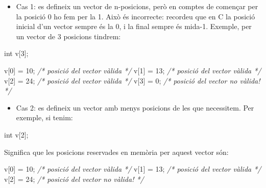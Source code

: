 \documentclass[]{book}
\newenvironment{Shaded}{\begin{snugshade}}{\end{snugshade}}
\newcommand{\DataTypeTok}[1]{\textcolor[rgb]{0.13,0.29,0.53}{#1}}
\newcommand{\DecValTok}[1]{\textcolor[rgb]{0.00,0.00,0.81}{#1}}
\newcommand{\CommentTok}[1]{\textcolor[rgb]{0.56,0.35,0.01}{\textit{#1}}}
\newcommand{\NormalTok}[1]{#1}
\providecommand{\tightlist}{%
  \setlength{\itemsep}{0pt}\setlength{\parskip}{0pt}}
\begin{document}
\begin{itemize}
\tightlist
\item
  Cas 1: es defineix un vector de n-posicions, però en comptes de
  començar per la posició 0 ho fem per la 1. Això és incorrecte:
  recordeu que en C la posició inicial d'un vector sempre és la 0, i la
  final sempre és mida-1. Exemple, per un vector de 3 posicions tindrem:
\end{itemize}

\begin{Shaded}
\begin{Highlighting}[]
\DataTypeTok{int}\NormalTok{ v[}\DecValTok{3}\NormalTok{];}

\NormalTok{v[}\DecValTok{0}\NormalTok{] = }\DecValTok{10}\NormalTok{;  }\CommentTok{/* posició del vector vàlida */}
\NormalTok{v[}\DecValTok{1}\NormalTok{] = }\DecValTok{13}\NormalTok{;  }\CommentTok{/* posició del vector vàlida */}
\NormalTok{v[}\DecValTok{2}\NormalTok{] = }\DecValTok{24}\NormalTok{;  }\CommentTok{/* posició del vector vàlida */}
\NormalTok{v[}\DecValTok{3}\NormalTok{] = }\DecValTok{0}\NormalTok{;   }\CommentTok{/* posició del vector no vàlida! */}
\end{Highlighting}
\end{Shaded}

\begin{itemize}
\tightlist
\item
  Cas 2: es defineix un vector amb menys posicions de les que
  necessitem. Per exemple, si tenim:
\end{itemize}

\begin{Shaded}
\begin{Highlighting}[]
\DataTypeTok{int}\NormalTok{ v[}\DecValTok{2}\NormalTok{];}
\end{Highlighting}
\end{Shaded}

Significa que les posicions reservades en memòria per aquest vector són:

\begin{Shaded}
\begin{Highlighting}[]
\NormalTok{v[}\DecValTok{0}\NormalTok{] = }\DecValTok{10}\NormalTok{;  }\CommentTok{/* posició del vector vàlida */}
\NormalTok{v[}\DecValTok{1}\NormalTok{] = }\DecValTok{13}\NormalTok{;  }\CommentTok{/* posició del vector vàlida */}
\NormalTok{v[}\DecValTok{2}\NormalTok{] = }\DecValTok{24}\NormalTok{;  }\CommentTok{/* posició del vector no vàlida! */}
\end{Highlighting}
\end{Shaded}
\end{document}
